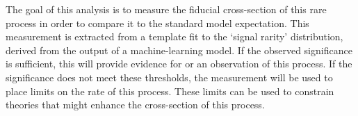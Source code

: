 The goal of this analysis is to measure the fiducial cross-section of this rare
process in order to compare it to the standard model expectation.
This measurement is extracted from a template fit to the `signal rarity'
distribution, derived from the output of a machine-learning model.
If the observed significance is sufficient, this will provide evidence for or an
observation of this process. If the significance does not meet these thresholds,
the measurement will be used to place limits on the rate of this process. These
limits can be used to constrain theories that might enhance the cross-section of
this process.


